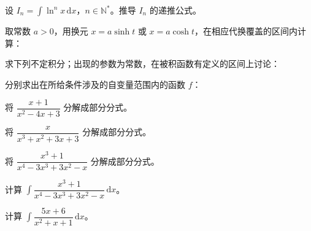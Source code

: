 \noindent\begin{minipage}{\textwidth}
设 $I_n=\int\ln^nx\,\mathrm dx$，$n\in\mathbb N^*$。推导 $I_n$ 的递推公式。
\end{minipage}\par\vfill
\newpage
\noindent\begin{minipage}{\textwidth}
取常数 $a>0$，用换元 $x=a\sinh t$ 或 $x=a\cosh t$，在相应代换覆盖的区间内计算：
\end{minipage}\par\vfill
\noindent\begin{minipage}{\textwidth}
求下列不定积分；出现的参数为常数，在被积函数有定义的区间上讨论：
\end{minipage}\par\vfill
\noindent\begin{minipage}{\textwidth}
分别求出在所给条件涉及的自变量范围内的函数 $f$：
\end{minipage}\par\vfill
\newpage
\noindent\begin{minipage}{\textwidth}
将 $\dfrac{x+1}{x^2-4x+3}$ 分解成部分分式。
\end{minipage}\par\vfill
\noindent\begin{minipage}{\textwidth}
将 $\dfrac{x}{x^3+x^2+3x+3}$ 分解成部分分式。
\end{minipage}\par\vfill
\noindent\begin{minipage}{\textwidth}
将 $\dfrac{x^3+1}{x^4-3x^3+3x^2-x}$ 分解成部分分式。
\end{minipage}\par\vfill
\newpage
\noindent\begin{minipage}{\textwidth}
计算 $\int\dfrac{x^3+1}{x^4-3x^3+3x^2-x}\,\mathrm dx$。
\end{minipage}\par\vfill
\noindent\begin{minipage}{\textwidth}
计算 $\int\dfrac{5x+6}{x^2+x+1}\,\mathrm dx$。
\end{minipage}\par\vfill
